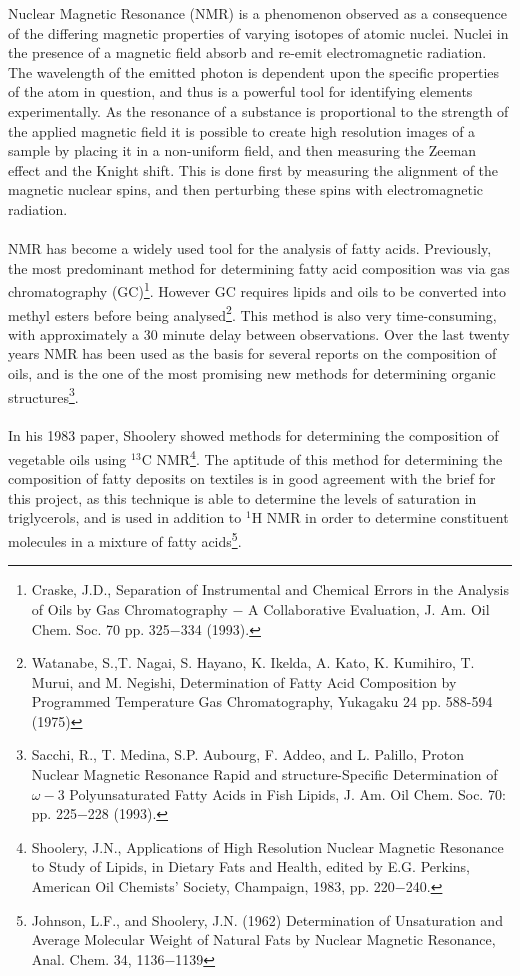 \documentclass[a4paper ,12pt]{article}
\begin{document}
Nuclear Magnetic Resonance (NMR) is a phenomenon observed as a consequence of the differing magnetic properties of varying isotopes of atomic nuclei. Nuclei in the presence of a magnetic field absorb and re-emit electromagnetic radiation. The wavelength of the emitted photon is dependent upon the specific properties of the atom in question, and thus is a powerful tool for identifying elements experimentally. As the resonance of a substance is proportional to the strength of the applied magnetic field it is possible to create high resolution images of a sample by placing it in a non-uniform field, and then measuring the Zeeman effect and the Knight shift. This is done first by measuring the alignment of the magnetic nuclear spins, and then perturbing these spins with electromagnetic radiation.\\\\NMR has become a widely used tool for the analysis of fatty acids. Previously, the most predominant method for determining fatty acid composition was via gas chromatography (GC)\footnote{Craske, J.D., Separation of Instrumental and Chemical Errors in the Analysis of Oils by Gas Chromatography $-$ A Collaborative Evaluation, J. Am. Oil Chem. Soc. 70 pp. 325$-$334 (1993).}. However GC requires lipids and oils to be converted into methyl esters before being analysed\footnote{Watanabe, S.,T. Nagai, S. Hayano, K. Ikelda, A. Kato, K. Kumihiro, T. Murui, and M. Negishi, Determination of Fatty Acid Composition by Programmed Temperature Gas Chromatography, Yukagaku 24 pp. 588-594 (1975)}.  This method is also very time-consuming, with approximately a 30 minute delay between observations. Over the last twenty years NMR has been used as the basis for several reports on the composition of oils, and is the one of the most promising new methods for determining organic structures\footnote{Sacchi, R., T. Medina, S.P. Aubourg, F. Addeo, and L. Palillo, Proton Nuclear Magnetic Resonance Rapid and structure-Specific Determination of $\omega-$3 Polyunsaturated Fatty Acids in Fish Lipids, J. Am. Oil Chem. Soc. 70: pp. 225$-$228 (1993).}.\\\\In his 1983 paper, Shoolery showed methods for determining the composition of vegetable oils using $^{13}$C NMR\footnote{Shoolery, J.N., Applications of High Resolution Nuclear Magnetic Resonance to Study of Lipids, in Dietary Fats and Health, edited by E.G. Perkins, American Oil Chemists’ Society, Champaign, 1983, pp. 220$-$240.}.  The aptitude of this method for determining the composition of fatty deposits on textiles is in good agreement with the brief for this project, as this technique is able to determine the levels of saturation in triglycerols, and is used in addition to $^1$H NMR in order to determine constituent molecules in a mixture of fatty acids\footnote{Johnson, L.F., and Shoolery, J.N. (1962) Determination of Unsaturation and Average Molecular Weight of Natural Fats by Nuclear Magnetic Resonance, Anal. Chem. 34, 1136$-$1139}.
\end{document}
